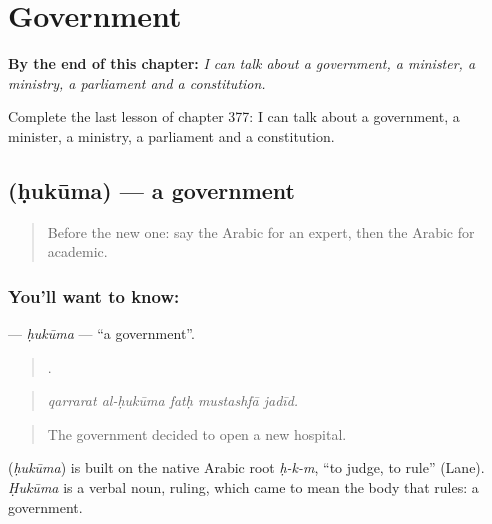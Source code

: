 
\chapter{Government}
\label{ch:ar-government}

\begin{chapteropening}
\textbf{By the end of this chapter:} \emph{I can talk about a government, a minister, a ministry, a parliament and a constitution.}

Complete the last lesson of chapter 377: I can talk about a government, a minister, a ministry, a parliament and a constitution.
\end{chapteropening}

\section[\texorpdfstring{\ar{حكومة} (ḥukūma)}{حكومة (ḥukūma)}]{ (ḥukūma) — a government}

\label{lesson:AR-C377-hukuma}



\begin{quote}
Before the new one: say the Arabic for an expert, then the Arabic for academic.
\end{quote}

\subsection*{You'll want to know: }
\textbf{} — \emph{ḥukūma} — \textquotedblleft{}a government\textquotedblright{}.

\begin{quote}
    .
\end{quote}

\begin{quote}
\emph{qarrarat al-ḥukūma fatḥ mustashfā jadīd.}
\end{quote}

\begin{quote}
The government decided to open a new hospital.
\end{quote}

\begin{cousinweb}
\textbf{} (\emph{ḥukūma}) is built on the native Arabic root \emph{ḥ-k-m}, \textquotedblleft{}to judge, to rule\textquotedblright{} (Lane). \emph{Ḥukūma} is a verbal noun, ruling, which came to mean the body that rules: a government.
\end{cousinweb}

